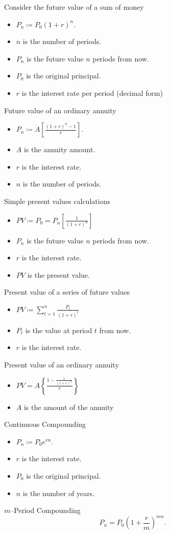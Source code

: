 Consider the future value of a sum of money
\begin{itemize}
	\item $P_{n}\coloneqq P_{0}{\left(1+r\right)}^{n}$.
	\item $n$ is the number of periods.
	\item $P_{n}$ is the future value $n$ periods from now.
	\item $P_{0}$ is the original principal.
	\item $r$ is the interest rate per period (decimal form)
\end{itemize}
Future value of an ordinary annuity
\begin{itemize}
	\item $P_{n}\coloneqq A\left[\frac{{\left(1+r\right)}^{n}-1}{r}\right]$.
	\item $A$ is the annuity amount.
	\item $r$ is the interest rate.
	\item $n$ is the number of periods.
\end{itemize}
Simple present values calculations
\begin{itemize}
	\item $PV\coloneqq P_{0}=P_{n}\left[\frac{1}{{\left(1+r\right)}^{n}}\right]$
	\item $P_{n}$ is the future value $n$ periods from now.
	\item $r$ is the interest rate.
	\item $PV$ is the present value.
\end{itemize}
Present value of a series of future values
\begin{itemize}
	\item $PV\coloneqq\sum_{t=1}^{n}\frac{P_{t}}{{\left(1+r\right)}^{t}}$
	\item $P_{t}$ is the value at period $t$ from now.
	\item $r$ is the interest rate.
\end{itemize}
Present value of an ordinary annuity
\begin{itemize}
	\item $PV=A\left\{\frac{1-\frac{1}{{\left(1+r\right)}^{n}}}{r}\right\}$
	\item $A$ is the amount of the annuity
\end{itemize}
Continuous Compounding
\begin{itemize}
	\item $P_{n}\coloneqq P_{0}e^{rn}$.
	\item $r$ is the interest rate.
	\item $P_{0}$ is the original principal.
	\item $n$ is the number of years.
\end{itemize}
$m$--Period Compounding \[ P_{n}=P_{0}{\left(1+\frac{r}{m}\right)}^{mn}. \]